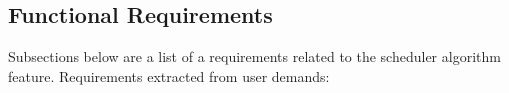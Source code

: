 \documentclass{report}
\begin{document}
\subsection{Functional Requirements}

Subsections below are a list of a requirements related to the scheduler algorithm feature.
Requirements extracted from user demands:
\end{document}
